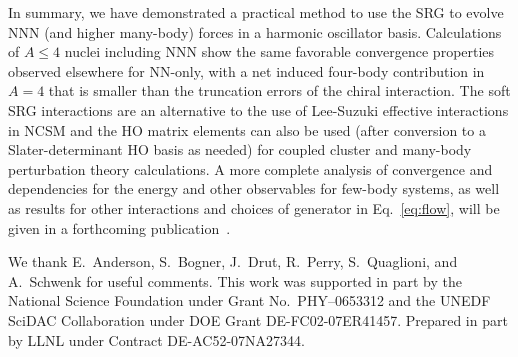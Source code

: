 \documentclass[prc,twocolumn,showpacs,floatfix,nofootinbib,superscriptaddress]{revtex4}
\begin{document}
In summary, we have demonstrated a practical method to use the
SRG to evolve NNN (and higher many-body) forces in a
harmonic oscillator basis.
Calculations of $A \leq 4$ nuclei including NNN show the same
favorable convergence properties observed elsewhere for NN-only, 
with a net induced four-body contribution in $A=4$ that is smaller
than the truncation errors of the chiral interaction.    
The soft SRG interactions are
an alternative to the use of Lee-Suzuki effective interactions in
NCSM and the HO matrix elements can also be used (after conversion to a
Slater-determinant HO basis as needed) for coupled cluster and many-body
perturbation theory calculations. 
A more complete analysis of convergence and
dependencies for the energy and other observables for few-body
systems, as well as results for other interactions and choices of
generator in Eq.~\eqref{eq:flow}, will be given in a forthcoming
publication~\cite{Jurgenson:2009}.


\begin{acknowledgments}
We thank E.~Anderson, S.~Bogner, J.~Drut, R.~Perry, S.~Quaglioni, and 
A.~Schwenk for useful comments.  This work was
supported in part by the National Science Foundation under Grant
No.~PHY--0653312 and the UNEDF SciDAC Collaboration under DOE Grant
DE-FC02-07ER41457.
Prepared in part by LLNL under Contract DE-AC52-07NA27344.

\end{acknowledgments}


\end{document}
